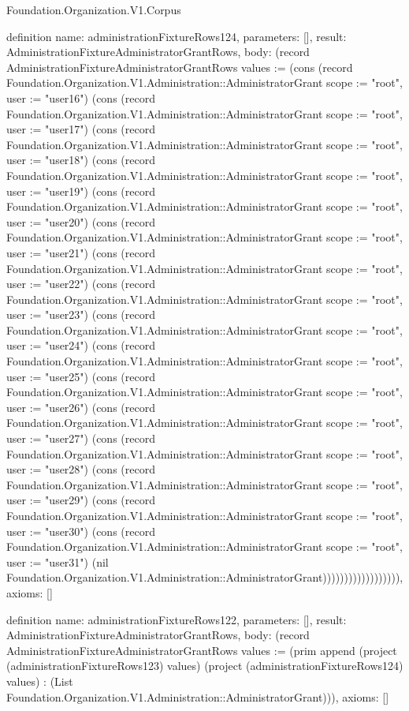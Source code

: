 \begin{lexlean}{Foundation.Organization.V1.Corpus}
\begin{semanticmodule}
definition{
  name: administrationFixtureRows124,
  parameters: [],
  result: AdministrationFixtureAdministratorGrantRows,
  body: (record AdministrationFixtureAdministratorGrantRows {values := (cons (record Foundation.Organization.V1.Administration::AdministratorGrant {scope := "root", user := "user16"}) (cons (record Foundation.Organization.V1.Administration::AdministratorGrant {scope := "root", user := "user17"}) (cons (record Foundation.Organization.V1.Administration::AdministratorGrant {scope := "root", user := "user18"}) (cons (record Foundation.Organization.V1.Administration::AdministratorGrant {scope := "root", user := "user19"}) (cons (record Foundation.Organization.V1.Administration::AdministratorGrant {scope := "root", user := "user20"}) (cons (record Foundation.Organization.V1.Administration::AdministratorGrant {scope := "root", user := "user21"}) (cons (record Foundation.Organization.V1.Administration::AdministratorGrant {scope := "root", user := "user22"}) (cons (record Foundation.Organization.V1.Administration::AdministratorGrant {scope := "root", user := "user23"}) (cons (record Foundation.Organization.V1.Administration::AdministratorGrant {scope := "root", user := "user24"}) (cons (record Foundation.Organization.V1.Administration::AdministratorGrant {scope := "root", user := "user25"}) (cons (record Foundation.Organization.V1.Administration::AdministratorGrant {scope := "root", user := "user26"}) (cons (record Foundation.Organization.V1.Administration::AdministratorGrant {scope := "root", user := "user27"}) (cons (record Foundation.Organization.V1.Administration::AdministratorGrant {scope := "root", user := "user28"}) (cons (record Foundation.Organization.V1.Administration::AdministratorGrant {scope := "root", user := "user29"}) (cons (record Foundation.Organization.V1.Administration::AdministratorGrant {scope := "root", user := "user30"}) (cons (record Foundation.Organization.V1.Administration::AdministratorGrant {scope := "root", user := "user31"}) (nil Foundation.Organization.V1.Administration::AdministratorGrant)))))))))))))))))}),
  axioms: []
}

definition{
  name: administrationFixtureRows122,
  parameters: [],
  result: AdministrationFixtureAdministratorGrantRows,
  body: (record AdministrationFixtureAdministratorGrantRows {values := (prim append (project (administrationFixtureRows123) values) (project (administrationFixtureRows124) values) : (List Foundation.Organization.V1.Administration::AdministratorGrant))}),
  axioms: []
}


\end{semanticmodule}
\end{lexlean}
